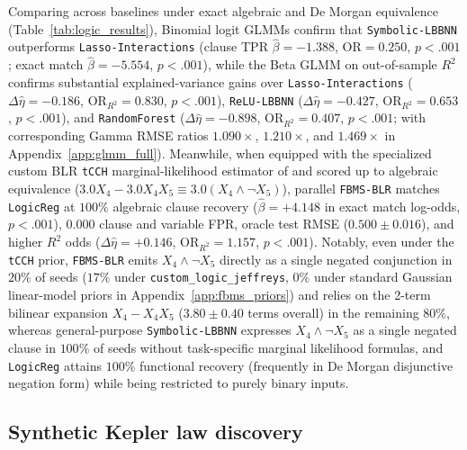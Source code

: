 \documentclass[11pt,a4paper]{article}
\begin{document}
Comparing across baselines under exact algebraic and De Morgan equivalence (Table~\ref{tab:logic_results}), Binomial logit GLMMs confirm that \texttt{Symbolic-LBBNN} outperforms \texttt{Lasso-Interactions} (clause TPR $\hat{\beta} = -1.388$, $\mathrm{OR} = 0.250$, $p < .001$; exact match $\hat{\beta} = -5.554$, $p < .001$), while the Beta GLMM on out-of-sample $R^2$ confirms substantial explained-variance gains over \texttt{Lasso-Interactions} ($\Delta\hat{\eta} = -0.186$, $\mathrm{OR}_{R^2} = 0.830$, $p < .001$), \texttt{ReLU-LBBNN} ($\Delta\hat{\eta} = -0.427$, $\mathrm{OR}_{R^2} = 0.653$, $p < .001$), and \texttt{RandomForest} ($\Delta\hat{\eta} = -0.898$, $\mathrm{OR}_{R^2} = 0.407$, $p < .001$; with corresponding Gamma RMSE ratios $1.090\times$, $1.210\times$, and $1.469\times$ in Appendix~\ref{app:glmm_full}). Meanwhile, when equipped with the specialized custom BLR \texttt{tCCH} marginal-likelihood estimator of \citet{frommlet2025fbms} and scored up to algebraic equivalence ($3.0 X_4 - 3.0 X_4 X_5 \equiv 3.0(X_4 \land \neg X_5)$), parallel \texttt{FBMS-BLR} matches \texttt{LogicReg} at $100\%$ algebraic clause recovery ($\hat{\beta} = +4.148$ in exact match log-odds, $p < .001$), $0.000$ clause and variable FPR, oracle test RMSE ($0.500 \pm 0.016$), and higher $R^2$ odds ($\Delta\hat{\eta} = +0.146$, $\mathrm{OR}_{R^2} = 1.157$, $p < .001$). Notably, even under the \texttt{tCCH} prior, \texttt{FBMS-BLR} emits $X_4 \land \neg X_5$ directly as a single negated conjunction in $20\%$ of seeds ($17\%$ under \texttt{custom\_logic\_jeffreys}, $0\%$ under standard Gaussian linear-model priors in Appendix~\ref{app:fbms_priors}) and relies on the 2-term bilinear expansion $X_4 - X_4 X_5$ ($3.80 \pm 0.40$ terms overall) in the remaining $80\%$, whereas general-purpose \texttt{Symbolic-LBBNN} expresses $X_4 \land \neg X_5$ as a single negated clause in $100\%$ of seeds without task-specific marginal likelihood formulas, and \texttt{LogicReg} attains $100\%$ functional recovery (frequently in De Morgan disjunctive negation form) while being restricted to purely binary inputs.

\subsection{Synthetic Kepler law discovery}
\label{sec:exp:kepler_syn}
\end{document}
